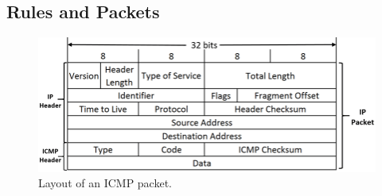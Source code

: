 \documentclass[sigconf,review, anonymous]{acmart}
\begin{document}
  

\subsection{Rules and Packets}
\label{sec:rules-and-packets}

\begin{figure}[t!]
\centering
\includegraphics[scale=0.28]{figs/ICMP-packet-structure.png}
\vspace{-2ex}
\caption{Layout of an ICMP packet.}
\label{fig:icmp-packet-layout}
\end{figure}
\end{document}
